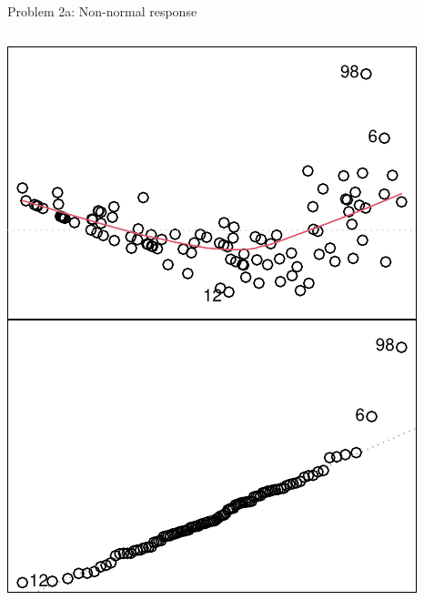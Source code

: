 \documentclass[
  ignorenonframetext,
  aspectratio=169]{beamer}
\begin{document}
\begin{frame}[fragile]{Problem 2a: Non-normal response}
\begin{columns}[T]
\begin{column}{0.48\textwidth}
\includegraphics{03-Lecture_files/figure-beamer/unnamed-chunk-35-1.pdf}
\end{column}
\end{columns}
\end{frame}
\end{document}
